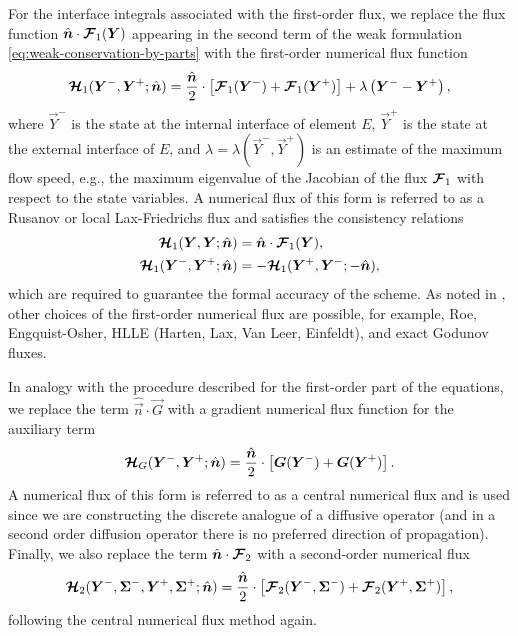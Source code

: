 \documentclass{report}
\numberwithin{equation}{section}
\begin{document}
For the interface integrals associated with the first-order flux, we replace the flux function $\hat{\boldsymbol{{n}} }\cdot \boldsymbol{{\mathcal{F}}}_1 (\boldsymbol{{Y}})$ appearing in the second term of the weak formulation \eqref{eq:weak-conservation-by-parts} with the first-order numerical flux function 
\begin{equation}
    \boldsymbol{{\mathcal{H}}}_1 (\boldsymbol{{Y}}^-, \boldsymbol{{Y}}^+; \hat{\boldsymbol{{n}} }) =
    \frac{\hat{\boldsymbol{{n}} }}{2} \cdot \left[\boldsymbol{{\mathcal{F}}}_1 (\boldsymbol{{Y}}^-) + \boldsymbol{{\mathcal{F}}}_1(\boldsymbol{{Y}}^+) \right] + \lambda \left(\boldsymbol{{Y}}^- - \boldsymbol{{Y}}^+\right) ,
\end{equation}
where $\vec Y^-$ is the state at the internal interface of element $E$, $\vec Y^+$ is the state at the external interface of $E$, and $\lambda = \lambda(\vec Y^-, \vec Y^+)$ is an estimate of the maximum flow speed, e.g., the maximum eigenvalue of the Jacobian of the flux $\boldsymbol{{\mathcal{F}}}_1$ with respect to the state variables. A numerical flux of this form is referred to as a Rusanov or local Lax-Friedrichs flux and satisfies the consistency relations
\begin{align}
    \boldsymbol{{\mathcal{H}}}_1 (\boldsymbol{{Y}}, \boldsymbol{{Y}}; \hat{\boldsymbol{{n}} }) & = \hat{\boldsymbol{{n}} } \cdot \boldsymbol{{\mathcal{F}}}_1 (\boldsymbol{{Y}}), \\
    \boldsymbol{{\mathcal{H}}}_1 (\boldsymbol{{Y}}^-, \boldsymbol{{Y}}^+; \hat{\boldsymbol{{n}} }) & = - \boldsymbol{{\mathcal{H}}}_1 (\boldsymbol{{Y}}^+, \boldsymbol{{Y}}^-; -\hat{\boldsymbol{{n}} }),
\end{align}
which are required to guarantee the formal accuracy of the scheme. As noted in \citet{bassi:1997nse}, other choices of the first-order numerical flux are possible, for example, Roe, Engquist-Osher, HLLE (Harten, Lax, Van Leer, Einfeldt), and exact Godunov fluxes.

In analogy with the procedure described for the first-order part of the equations, we replace the term $\hat{\vec n } \cdot \vec G$ with a gradient numerical flux function for the auxiliary term
\begin{equation}
    \boldsymbol{{\mathcal{H}}}_G (\boldsymbol{{Y}}^-, \boldsymbol{{Y}}^+; \hat{\boldsymbol{{n}} }) 
    = \frac{\hat{\boldsymbol{{n}} }}{2} \cdot \left[ \boldsymbol{{G}}(\boldsymbol{{Y}}^-) + \boldsymbol{{G}}(\boldsymbol{{Y}}^+) \right].
\end{equation}
A numerical flux of this form is referred to as a central numerical flux and is used since we are constructing the discrete analogue of a diffusive operator (and in a second order diffusion operator there is no preferred direction of propagation). Finally, we also replace the term $\hat{\boldsymbol{{n}} } \cdot \boldsymbol{{\mathcal{F}}}_2$ with a second-order numerical flux
\begin{equation}
    \boldsymbol{{\mathcal{H}}}_2 (\boldsymbol{{Y}}^-, \boldsymbol{{\Sigma}}^-, \boldsymbol{{Y}}^+, \boldsymbol{{\Sigma}}^+; \hat{\boldsymbol{{n}} }) 
    = \frac{\hat{\boldsymbol{{n}} }}{2} \cdot \left[ \boldsymbol{{\mathcal{F}}}_2 (\boldsymbol{{Y}}^-, \boldsymbol{{\Sigma}}^-) + \boldsymbol{{\mathcal{F}}}_2 (\boldsymbol{{Y}}^+, \boldsymbol{{\Sigma}}^+) \right],
\end{equation}
following the central numerical flux method again. 
\end{document}
